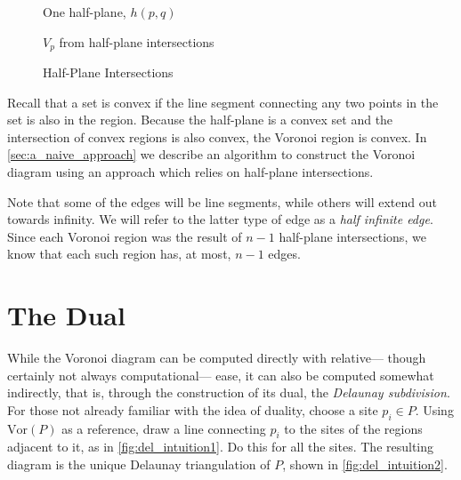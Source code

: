 \documentclass[12pt,twoside]{reedthesis}
\begin{document}
    \begin{figure}[H]
      \centering
      \begin{subtable}{.475\textwidth}
        
        \caption{One half-plane, $h(p, q)$}
        \label{fig:one_half_plane}
      \end{subtable}%
      \begin{subtable}{.475\textwidth}
      \centering
        
        \caption{$V_{p}$ from half-plane intersections}
        \label{fig:all_half_planes}
      \end{subtable}
      \caption{Half-Plane Intersections}
      \label{fig:half_planes}
    \end{figure}

    Recall that a set is convex if the line segment connecting any two points in the set is also in the region. Because the half-plane is a convex set and the intersection of convex regions is also convex, the Voronoi region is convex. In \cref{sec:a_naive_approach} we describe an algorithm to construct the Voronoi diagram using an approach which relies on half-plane intersections.\par


    Note that some of the edges will be line segments, while others will extend out towards infinity. We will refer to the latter type of edge as a \emph{half infinite edge}. Since each Voronoi region was the result of $n-1$ half-plane intersections, we know that each such region has, at most, $n-1$ edges. \par

  \section{The Dual} %
  \label{sec:the_dual}
    While the Voronoi diagram can be computed directly with relative--- though certainly not always computational--- ease, it can also be computed somewhat indirectly, that is, through the construction of its dual, the \emph{Delaunay subdivision}. For those not already familiar with the idea of duality, choose a site $p_{i} \in P$. Using $\mbox{Vor}(P)$ as a reference, draw a line connecting $p_{i}$ to the sites of the regions adjacent to it, as in \cref{fig:del_intuition1}. Do this for all the sites. The resulting diagram is the unique Delaunay triangulation of $P$, shown in \cref{fig:del_intuition2}.\par
\end{document}
